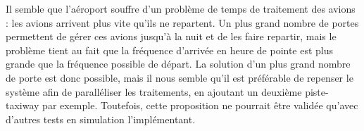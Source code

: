 Il semble que l'aéroport souffre d'un problème de temps de traitement des avions : les avions arrivent plus vite qu'ils ne repartent. Un plus grand nombre de portes permettent de gérer ces avions jusqu'à la nuit et de les faire repartir, mais le problème tient au fait que la fréquence d'arrivée en heure de pointe est plus grande que la fréquence possible de départ.
La solution d'un plus grand nombre de porte est donc possible, mais il nous semble qu'il est préférable de repenser le système afin de paralléliser les traitements, en ajoutant un deuxième piste-taxiway par exemple. Toutefois, cette proposition ne pourrait être validée qu'avec d'autres tests en simulation l'implémentant.


